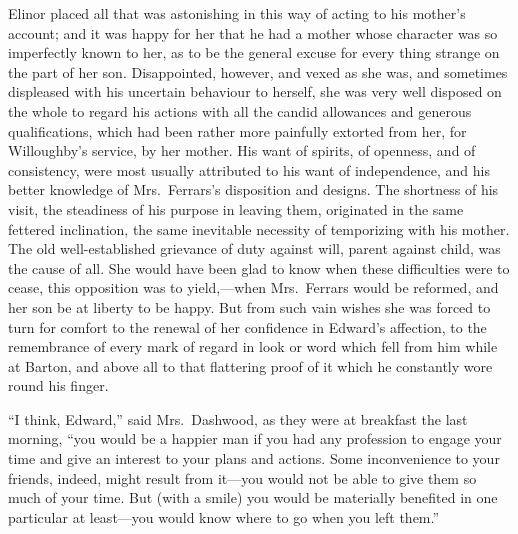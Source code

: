 \documentclass{article}
\begin{document}
Elinor placed all that was astonishing in this
way of acting to his mother's account; and it was
happy for her that he had a mother whose character
was so imperfectly known to her, as to be the general
excuse for every thing strange on the part of her son.
Disappointed, however, and vexed as she was, and sometimes
displeased with his uncertain behaviour to herself,
she was very well disposed on the whole to regard his actions
with all the candid allowances and generous qualifications,
which had been rather more painfully extorted from her,
for Willoughby's service, by her mother.  His want of spirits,
of openness, and of consistency, were most usually
attributed to his want of independence, and his better
knowledge of Mrs.\ Ferrars's disposition and designs.
The shortness of his visit, the steadiness of his purpose
in leaving them, originated in the same fettered inclination,
the same inevitable necessity of temporizing with his mother.
The old well-established grievance of duty against will,
parent against child, was the cause of all.  She would have
been glad to know when these difficulties were to cease,
this opposition was to yield,---when Mrs.\ Ferrars would
be reformed, and her son be at liberty to be happy.
But from such vain wishes she was forced to turn for comfort
to the renewal of her confidence in Edward's affection,
to the remembrance of every mark of regard in look or word
which fell from him while at Barton, and above all
to that flattering proof of it which he constantly wore
round his finger.

``I think, Edward,'' said Mrs.\ Dashwood, as they were
at breakfast the last morning, ``you would be a happier man
if you had any profession to engage your time and give
an interest to your plans and actions.  Some inconvenience
to your friends, indeed, might result from it---you
would not be able to give them so much of your time.
But (with a smile) you would be materially benefited
in one particular at least---you would know where to go
when you left them.''
\end{document}
